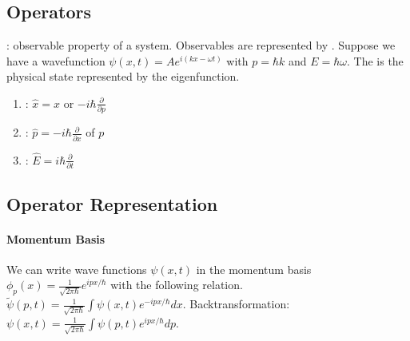 
\subsection{Operators}
: observable property of a system. Observables are represented by
. Suppose we have a wavefunction $\psi(x,t) = A e^{i(kx-\omega t)}$
with $p = \hbar k$ and $E = \hbar \omega$. The  is the physical
state represented by the eigenfunction.
\begin{enumerate}[]
    \item {}: $\hat{x} = x$ or $-i \hbar \frac{\partial}{\partial p}$
    \item {}: $\hat{p} = -i \hbar \frac{\partial}{\partial x}$ of $p$
    \item {}: $\hat{E} = i \hbar \frac{\partial}{\partial t}$
\end{enumerate}

\subsection{Operator Representation}

\paragraph{Momentum Basis}
We can write wave functions $\psi(x,t)$ in the momentum basis $\phi_p(x) =
\frac{1}{\sqrt{2 \pi \hbar}} e^{i p x / \hbar}$ with the following relation.
$\tilde{\psi}(p,t) = \frac{1}{\sqrt{2 \pi \hbar}} \int \psi(x,t) e^{-i p x / \hbar} dx$.
Backtransformation:
$\psi(x,t) = \frac{1}{\sqrt{2 \pi \hbar}} \int \psi(p,t) e^{i p x / \hbar} dp$.

